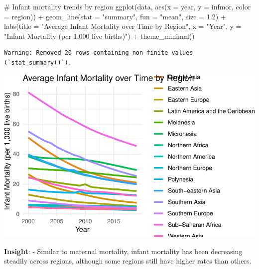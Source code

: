\documentclass[
  letterpaper,
  DIV=11,
  numbers=noendperiod]{scrartcl}
\newenvironment{Shaded}{\begin{snugshade}}{\end{snugshade}}
\newcommand{\AttributeTok}[1]{\textcolor[rgb]{0.40,0.45,0.13}{#1}}
\newcommand{\CommentTok}[1]{\textcolor[rgb]{0.37,0.37,0.37}{#1}}
\newcommand{\FloatTok}[1]{\textcolor[rgb]{0.68,0.00,0.00}{#1}}
\newcommand{\FunctionTok}[1]{\textcolor[rgb]{0.28,0.35,0.67}{#1}}
\newcommand{\NormalTok}[1]{\textcolor[rgb]{0.00,0.23,0.31}{#1}}
\newcommand{\SpecialCharTok}[1]{\textcolor[rgb]{0.37,0.37,0.37}{#1}}
\newcommand{\StringTok}[1]{\textcolor[rgb]{0.13,0.47,0.30}{#1}}
\begin{document}
\begin{Shaded}
\begin{Highlighting}[]
\CommentTok{\# Infant mortality trends by region}
\FunctionTok{ggplot}\NormalTok{(data, }\FunctionTok{aes}\NormalTok{(}\AttributeTok{x =}\NormalTok{ year, }\AttributeTok{y =}\NormalTok{ infmor, }\AttributeTok{color =}\NormalTok{ region)) }\SpecialCharTok{+}
  \FunctionTok{geom\_line}\NormalTok{(}\AttributeTok{stat =} \StringTok{"summary"}\NormalTok{, }\AttributeTok{fun =} \StringTok{"mean"}\NormalTok{, }\AttributeTok{size =} \FloatTok{1.2}\NormalTok{) }\SpecialCharTok{+}
  \FunctionTok{labs}\NormalTok{(}\AttributeTok{title =} \StringTok{"Average Infant Mortality over Time by Region"}\NormalTok{, }\AttributeTok{x =} \StringTok{"Year"}\NormalTok{, }\AttributeTok{y =} \StringTok{"Infant Mortality (per 1,000 live births)"}\NormalTok{) }\SpecialCharTok{+}
  \FunctionTok{theme\_minimal}\NormalTok{()}
\end{Highlighting}
\end{Shaded}

\begin{verbatim}
Warning: Removed 20 rows containing non-finite values (`stat_summary()`).
\end{verbatim}

\includegraphics{EDA_files/figure-pdf/unnamed-chunk-11-1.pdf}

\textbf{Insight}: - Similar to maternal mortality, infant mortality has
been decreasing steadily across regions, although some regions still
have higher rates than others.
\end{document}
